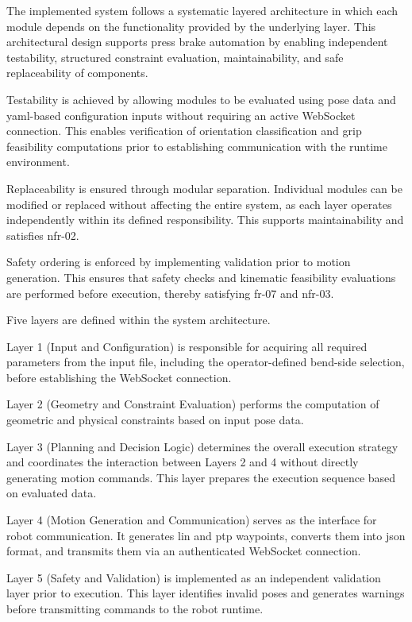 The implemented system follows a systematic layered architecture in which each module depends on the functionality provided by the underlying layer. This architectural design supports press brake automation by enabling independent testability, structured constraint evaluation, maintainability, and safe replaceability of components.

Testability is achieved by allowing modules to be evaluated using pose data and \acs{yaml}-based configuration inputs without requiring an active WebSocket connection. This enables verification of orientation classification and grip feasibility computations prior to establishing communication with the runtime environment.

Replaceability is ensured through modular separation. Individual modules can be modified or replaced without affecting the entire system, as each layer operates independently within its defined responsibility. This supports maintainability and satisfies \acs{nfr}-02.

Safety ordering is enforced by implementing validation prior to motion generation. This ensures that safety checks and kinematic feasibility evaluations are performed before execution, thereby satisfying \acs{fr}-07 and \acs{nfr}-03.

Five layers are defined within the system architecture.

Layer 1 (Input and Configuration) is responsible for acquiring all required parameters from the input file, including the operator-defined bend-side selection, before establishing the WebSocket connection.

Layer 2 (Geometry and Constraint Evaluation) performs the computation of geometric and physical constraints based on input pose data.

Layer 3 (Planning and Decision Logic) determines the overall execution strategy and coordinates the interaction between Layers 2 and 4 without directly generating motion commands. This layer prepares the execution sequence based on evaluated data.

Layer 4 (Motion Generation and Communication) serves as the interface for robot communication. It generates \ac{lin} and \ac{ptp} waypoints, converts them into \ac{json} format, and transmits them via an authenticated WebSocket connection.

Layer 5 (Safety and Validation) is implemented as an independent validation layer prior to execution. This layer identifies invalid poses and generates warnings before transmitting commands to the robot runtime.

